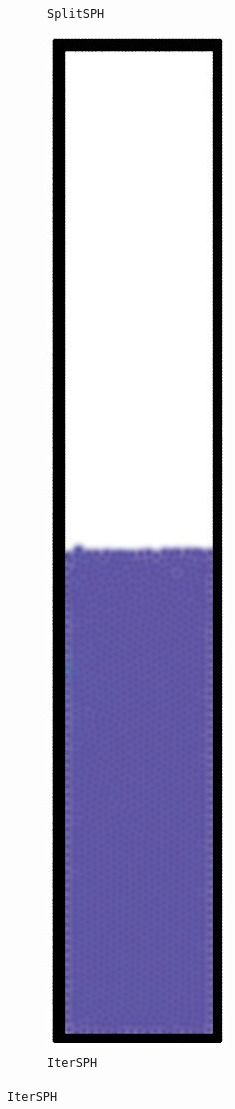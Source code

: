 \begin{figure}[h]
\begin{subfigure}[t]{0.1\textwidth}
    \caption{\small{\texttt{SplitSPH}}}
  \end{subfigure}
  \hspace*{0.1\textwidth}
  \begin{subfigure}[t]{0.1\textwidth}
    \centering
    \includegraphics*[width=\textwidth]{images/stability/iter.jpg}
    \caption{\small{\texttt{IterSPH}}}
  \end{subfigure}


\end{figure}
